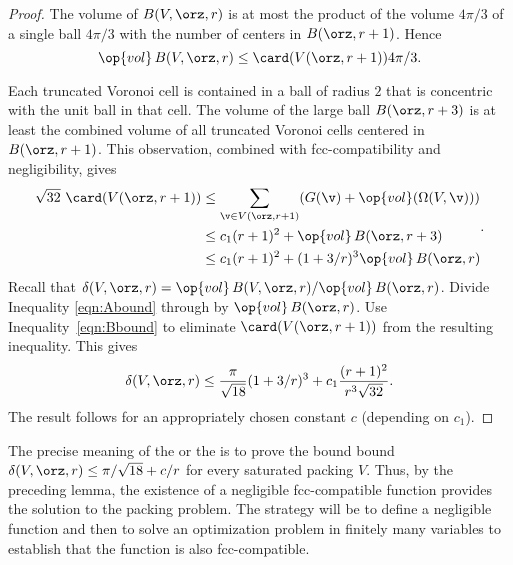 \begin{proof} 
The volume of $B( V,\orz,r)$ is at most the product of the volume
$4\pi/3$ of a single ball $4\pi/3$ with the number of centers in
$B(\orz,r+1)$.  Hence
\begin{equation} 
\op{vol}\, B( V,\orz,r) \le \card( V(\orz,r+1)) 4\pi/3.
\label{eqn:Abound}
\end{equation}

Each truncated Voronoi cell is contained in a ball of
radius $2$ that is concentric with the unit ball in that cell.  The volume
of the large ball $B(\orz,r+3)$ is at least the combined volume of 
all truncated Voronoi
cells centered in $B(\orz,r+1)$. This observation,
combined with fcc-compatibility and negligibility, gives
\begin{equation} 
\begin{split} 
\sqrt{32}\,\,\card( V(\orz,r+1))
&\le \sum_{\v\in V(\orz,r+1)} (G(\v) +
\op{vol}(\Omega(V,\v))) \\
&\le c_1 (r+1)^2 + \op{vol}\,B(\orz,r+3) \\
&\le c_1 (r+1)^2 + (1+3/r)^3 \op{vol}\,B(\orz,r)
\label{eqn:Bbound}
\end{split}.
\end{equation}
%
Recall that $\delta( V,\orz,r)=
\op{vol}\,B( V,\orz,r)/\op{vol}\,B(\orz,r)$. Divide Inequality
\ref{eqn:Abound} through by $\op{vol}\,B(\orz,r)$.  Use
Inequality~\ref{eqn:Bbound} to eliminate $\card( V(\orz,r+1))$ from the
resulting inequality.  This gives
\begin{displaymath}\delta( V,\orz,r)
\le \frac{\pi}{\sqrt{18}} (1+3/r)^3 + c_1 \frac{(r+1)^2}{r^3\sqrt{32}}.
\end{displaymath}
The result follows for an appropriately chosen constant $c$
(depending on $c_1$).
\end{proof}

\begin{remark}\label{remark:precise} The precise meaning of the
 or the  
is to prove the bound bound $\delta( V,\orz,r)
\le \pi/\sqrt{18} + c/r$ for every saturated packing $ V$.  Thus, by the
preceding lemma, the existence of a negligible fcc-compatible
function provides the solution to the packing problem.  The strategy
will be to define a negligible function and then to solve an
optimization problem in finitely many variables to establish that
the function is also fcc-compatible.
\end{remark}





